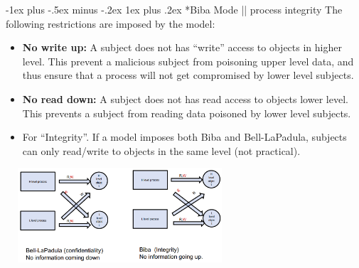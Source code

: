 \documentclass[10pt,landscape]{article}
\makeatletter
\renewcommand{\subsubsection}{\@startsection{subsubsection}{3}{0mm}%
                                {-1ex plus -.5ex minus -.2ex}%
                                {1ex plus .2ex}%
                                {\normalfont\small\bfseries}}
\makeatother
\begin{document}
\begin{multicols*}{3}
\subsubsection*{Biba Mode || process integrity}
The following restrictions are imposed by the model:
\begin{itemize}[noitemsep,wide=0pt, leftmargin=\dimexpr{} + 2\relax]
    \item \textbf{No write up:} A subject does not has “write” access to objects in higher level. This prevent a malicious subject
    from poisoning upper level data, and thus ensure that a process will not get compromised by lower level
    subjects.
    \item \textbf{No read down:} A subject does not has read access to objects lower level. This prevents a subject from reading
    data poisoned by lower level subjects. 
    \item For “Integrity”. If a model imposes both Biba and Bell-LaPadula, subjects can only read/write to objects in the same level (not
    practical).
\end{itemize} 
\includegraphics[width=8.5cm, height=3.5cm]{images/bellbiba.png}


\end{multicols*}
\end{document}
